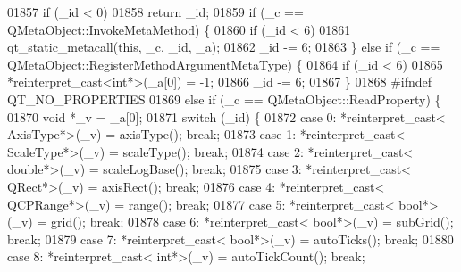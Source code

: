 \begin{DoxyCode}
01857     \textcolor{keywordflow}{if} (\_id < 0)
01858         \textcolor{keywordflow}{return} \_id;
01859     \textcolor{keywordflow}{if} (\_c == QMetaObject::InvokeMetaMethod) \{
01860         \textcolor{keywordflow}{if} (\_id < 6)
01861             qt\_static\_metacall(\textcolor{keyword}{this}, \_c, \_id, \_a);
01862         \_id -= 6;
01863     \} \textcolor{keywordflow}{else} \textcolor{keywordflow}{if} (\_c == QMetaObject::RegisterMethodArgumentMetaType) \{
01864         \textcolor{keywordflow}{if} (\_id < 6)
01865             *\textcolor{keyword}{reinterpret\_cast<}\textcolor{keywordtype}{int}*\textcolor{keyword}{>}(\_a[0]) = -1;
01866         \_id -= 6;
01867     \}
01868 \textcolor{preprocessor}{#ifndef QT\_NO\_PROPERTIES}
01869       \textcolor{keywordflow}{else} \textcolor{keywordflow}{if} (\_c == QMetaObject::ReadProperty) \{
01870         \textcolor{keywordtype}{void} *\_v = \_a[0];
01871         \textcolor{keywordflow}{switch} (\_id) \{
01872         \textcolor{keywordflow}{case} 0: *\textcolor{keyword}{reinterpret\_cast<} AxisType*\textcolor{keyword}{>}(\_v) = axisType(); \textcolor{keywordflow}{break};
01873         \textcolor{keywordflow}{case} 1: *\textcolor{keyword}{reinterpret\_cast<} ScaleType*\textcolor{keyword}{>}(\_v) = scaleType(); \textcolor{keywordflow}{break};
01874         \textcolor{keywordflow}{case} 2: *\textcolor{keyword}{reinterpret\_cast<} \textcolor{keywordtype}{double}*\textcolor{keyword}{>}(\_v) = scaleLogBase(); \textcolor{keywordflow}{break};
01875         \textcolor{keywordflow}{case} 3: *\textcolor{keyword}{reinterpret\_cast<} QRect*\textcolor{keyword}{>}(\_v) = axisRect(); \textcolor{keywordflow}{break};
01876         \textcolor{keywordflow}{case} 4: *\textcolor{keyword}{reinterpret\_cast<} QCPRange*\textcolor{keyword}{>}(\_v) = range(); \textcolor{keywordflow}{break};
01877         \textcolor{keywordflow}{case} 5: *\textcolor{keyword}{reinterpret\_cast<} \textcolor{keywordtype}{bool}*\textcolor{keyword}{>}(\_v) = grid(); \textcolor{keywordflow}{break};
01878         \textcolor{keywordflow}{case} 6: *\textcolor{keyword}{reinterpret\_cast<} \textcolor{keywordtype}{bool}*\textcolor{keyword}{>}(\_v) = subGrid(); \textcolor{keywordflow}{break};
01879         \textcolor{keywordflow}{case} 7: *\textcolor{keyword}{reinterpret\_cast<} \textcolor{keywordtype}{bool}*\textcolor{keyword}{>}(\_v) = autoTicks(); \textcolor{keywordflow}{break};
01880         \textcolor{keywordflow}{case} 8: *\textcolor{keyword}{reinterpret\_cast<} \textcolor{keywordtype}{int}*\textcolor{keyword}{>}(\_v) = autoTickCount(); \textcolor{keywordflow}{break};

\end{DoxyCode}
